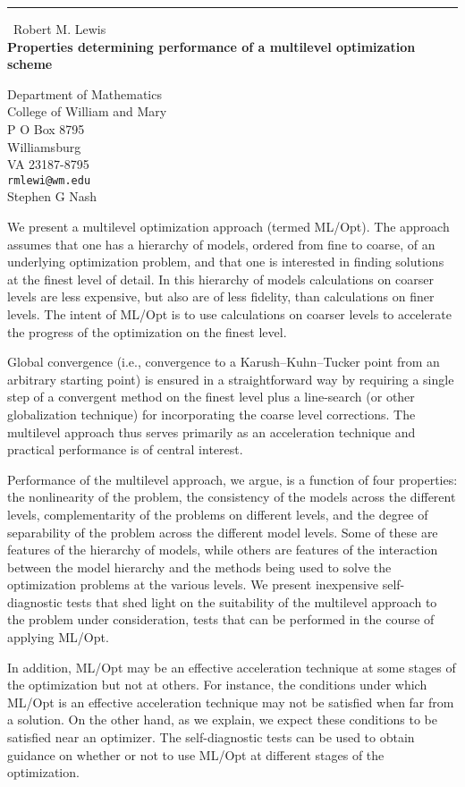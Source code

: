 \documentclass{report}
\begin{document}
\begin{center}
\rule{6in}{1pt} \
{\large Robert M. Lewis \\
{\bf Properties determining performance of a multilevel optimization scheme}}

Department of Mathematics \\ College of William and Mary \\ P O Box 8795 \\ Williamsburg \\ VA 23187-8795
\\
{\tt rmlewi@wm.edu}\\
Stephen G Nash\end{center}

We present a multilevel optimization approach (termed ML/Opt).
The approach assumes that one has a hierarchy of models, ordered from fine to
coarse, of an underlying optimization problem, and that one is interested in
finding solutions at the finest level of detail. In this hierarchy
of models calculations on coarser levels are less expensive, but also are of
less fidelity, than calculations on finer levels. The intent of ML/Opt is to
use calculations on coarser levels to accelerate the progress of the
optimization on the finest level.

Global convergence (i.e., convergence to a Karush--Kuhn--Tucker point from an
arbitrary starting point) is ensured in a straightforward way by requiring a
single step of a convergent method on the finest level plus a line-search (or
other globalization technique) for incorporating the coarse level corrections.
The multilevel approach thus serves primarily as an acceleration technique and
practical performance is of central interest.

Performance of the multilevel approach, we argue, is a function of four
properties: the nonlinearity of the problem, the consistency of the models
across the different levels, complementarity of the problems on different
levels, and the degree of separability of the problem across the different
model levels. Some of these are features of the hierarchy of models, while
others are features of the interaction between the model hierarchy and the
methods being used to solve the optimization problems at the various levels.
We present inexpensive self-diagnostic tests that shed light on the
suitability of the multilevel approach to the problem under consideration,
tests that can be performed in the course of applying ML/Opt.

In addition, ML/Opt may be an effective acceleration technique at some stages
of the optimization but not at others. For instance, the conditions under
which ML/Opt is an effective acceleration technique may not be satisfied when
far from a solution. On the other hand, as we explain, we expect these
conditions to be satisfied near an optimizer. The self-diagnostic tests can
be used to obtain guidance on whether or not to use ML/Opt at different stages
of the optimization.
\end{document}
